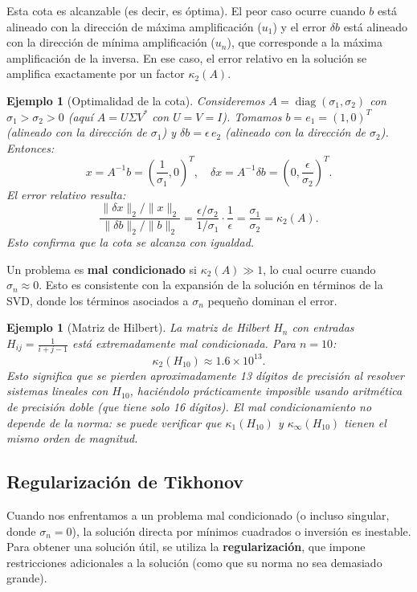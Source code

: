 \documentclass[a4paper,11pt]{report}
\newtheorem{example}[theorem]{Ejemplo}
\begin{document}
Esta cota es alcanzable (es decir, es óptima). El peor caso ocurre cuando $b$ está alineado con la dirección de máxima amplificación ($u_1$) y el error $\delta b$ está alineado con la dirección de mínima amplificación ($u_n$), que corresponde a la máxima amplificación de la inversa. En ese caso, el error relativo en la solución se amplifica exactamente por un factor $\kappa_2(A)$.

\begin{example}[Optimalidad de la cota]
Consideremos $A = \operatorname{diag}(\sigma_1, \sigma_2)$ con $\sigma_1 > \sigma_2 > 0$ (aquí $A = U\Sigma V^*$ con $U = V = I$). Tomamos $b = e_1 = (1, 0)^T$ (alineado con la dirección de $\sigma_1$) y $\delta b = \epsilon \, e_2$ (alineado con la dirección de $\sigma_2$). Entonces:
\[
x = A^{-1} b = \left(\frac{1}{\sigma_1}, 0\right)^T, \quad \delta x = A^{-1} \delta b = \left(0, \frac{\epsilon}{\sigma_2}\right)^T.
\]
El error relativo resulta:
\[
\frac{\|\delta x\|_2 / \|x\|_2}{\|\delta b\|_2 / \|b\|_2} = \frac{\epsilon / \sigma_2}{1/\sigma_1} \cdot \frac{1}{\epsilon} = \frac{\sigma_1}{\sigma_2} = \kappa_2(A).
\]
Esto confirma que la cota se alcanza con igualdad.
\end{example}

Un problema es \textbf{mal condicionado} si $\kappa_2(A) \gg 1$, lo cual ocurre cuando $\sigma_n \approx 0$. Esto es consistente con la expansión de la solución en términos de la SVD, donde los términos asociados a $\sigma_n$ pequeño dominan el error.



\begin{example}[Matriz de Hilbert]
La matriz de Hilbert $H_n$ con entradas $H_{ij} = \frac{1}{i+j-1}$ está extremadamente mal condicionada. Para $n=10$:
\[
\kappa_2(H_{10}) \approx 1.6 \times 10^{13}.
\]
Esto significa que se pierden aproximadamente 13 dígitos de precisión al resolver sistemas lineales con $H_{10}$, haciéndolo prácticamente imposible usando aritmética de precisión doble (que tiene solo 16 dígitos). El mal condicionamiento no depende de la norma: se puede verificar que $\kappa_1(H_{10})$ y $\kappa_\infty(H_{10})$ tienen el mismo orden de magnitud.
\end{example}

\subsection{Regularización de Tikhonov}

Cuando nos enfrentamos a un problema mal condicionado (o incluso singular, donde $\sigma_n=0$), la solución directa por mínimos cuadrados o inversión es inestable. Para obtener una solución útil, se utiliza la \textbf{regularización}, que impone restricciones adicionales a la solución (como que su norma no sea demasiado grande).
\end{document}
